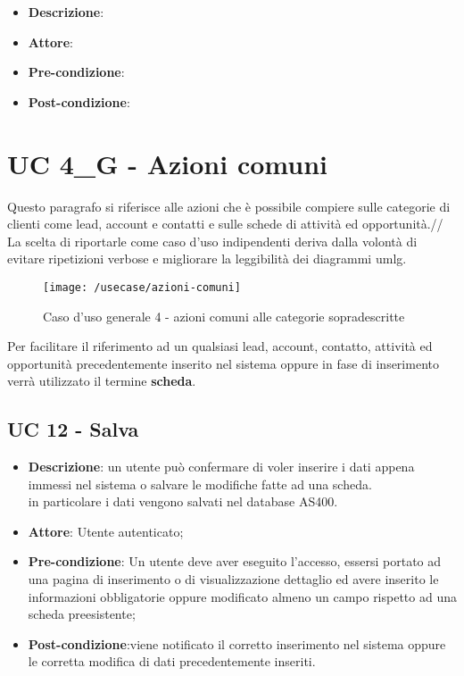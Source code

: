 \begin{itemize}
	\item \textbf{Descrizione}: %
	\item \textbf{Attore}: 
	\item \textbf{Pre-condizione}:
	\item \textbf{Post-condizione}:
\end{itemize}

\section{UC 4\_G - Azioni comuni}

Questo paragrafo si riferisce alle azioni che è possibile compiere sulle categorie di clienti come lead, account e contatti e sulle schede di attività ed opportunità.//
La scelta di riportarle come caso d'uso indipendenti deriva dalla volontà di evitare ripetizioni verbose e migliorare la leggibilità dei diagrammi \gls{umlg}.
\begin{figure}[h]
	\centering
	\texttt{[image: /usecase/azioni-comuni]}
	\caption{Caso d'uso generale 4 - azioni comuni alle categorie sopradescritte}
\end{figure}
Per facilitare il riferimento ad un qualsiasi lead, account, contatto, attività ed opportunità precedentemente inserito nel sistema oppure in fase di inserimento verrà utilizzato il termine \textbf{scheda}.
\subsection{UC 12 - Salva}

\begin{itemize}
	\item \textbf{Descrizione}: un utente può confermare di voler inserire i dati appena immessi nel sistema o salvare le modifiche fatte ad una scheda. \\
	 in particolare i dati vengono salvati nel database AS400.
	\item \textbf{Attore}: Utente autenticato;
	\item \textbf{Pre-condizione}: Un utente deve aver eseguito l'accesso, essersi portato ad una pagina di inserimento o di visualizzazione dettaglio ed avere inserito le informazioni obbligatorie oppure modificato almeno un campo rispetto ad una scheda preesistente;
	\item \textbf{Post-condizione}:viene notificato il corretto inserimento nel sistema oppure le corretta modifica di dati precedentemente inseriti.
\end{itemize}

